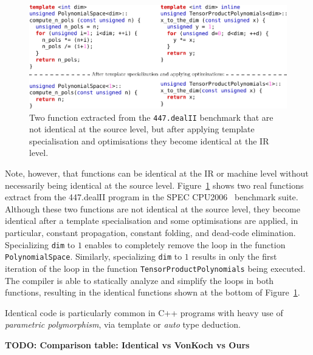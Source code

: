 \begin{figure}[h]
\centering
\includegraphics[scale=0.9]{src/relatedwork/figs/identical-example}
\caption{Two function extracted from the \texttt{447.dealII} benchmark that are not identical at the source level, but after applying template specialisation and optimisations they become identical at the IR level.}
\label{fig:identical-example}
\end{figure}

Note, however, that functions can be identical at the IR or machine level without necessarily being identical at the source level.
Figure~\ref{fig:identical-example} shows two real functions extract from the
447.dealII program in the SPEC CPU2006~\cite{spec} benchmark suite.
Although these two functions are not identical at the source level, they become
identical after a template specialisation and some optimisations are applied, in
particular, constant propagation, constant folding, and dead-code elimination. 
Specializing \verb|dim| to $1$ enables to completely remove the loop in the
function \verb|PolynomialSpace|.
Similarly, specializing \verb|dim| to $1$ results in only the first iteration
of the loop in the function \verb|TensorProductPolynomials| being executed.
The compiler is able to statically analyze and simplify the loops in both
functions, resulting in the identical functions shown at the bottom of
Figure~\ref{fig:identical-example}.

Identical code is particularly common in C++ programs
with heavy use of \textit{parametric polymorphism}, via template or \textit{auto} type deduction.







\textbf{TODO: Comparison table: Identical vs VonKoch vs Ours}






